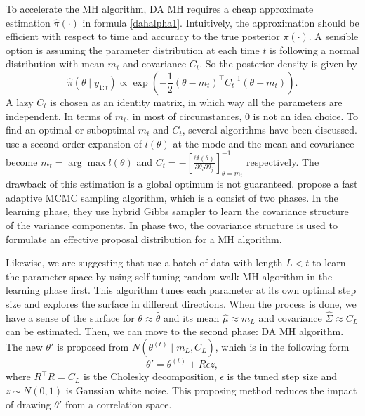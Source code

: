 To accelerate the MH algorithm, DA MH requires a cheap approximate estimation $\hat{\pi}(\cdot)$ in formula \eqref{dahalpha1}. Intuitively, the approximation should be efficient with respect to time and accuracy to the true posterior $\pi(\cdot)$. A sensible option is assuming the parameter distribution at each time $t$ is following a normal distribution with mean $m_t$ and covariance $C_t$. So the posterior density is given by 
\begin{equation}
\hat{\pi}(\theta\mid y_{1:t}) \propto \exp\left( -\frac{1}{2}(\theta-m_t)^\top C_t^{-1}(\theta-m_t)\right). 
\end{equation}
A lazy $C_t$ is chosen as an identity matrix, in which way all the parameters are independent. In terms of $m_t$, in most of circumstances, 0 is not an idea choice. To find an optimal or suboptimal $m_t$ and $C_t$, several algorithms have been discussed. \cite{stroud2018bayesian} use a second-order expansion of $l(\theta)$ at the mode and the mean and covariance become $m_t=\arg \max l(\theta)$ and $C_t = - \left[ \frac{\partial l(\theta)}{\partial \theta_i \partial \theta_j} \right]_{\theta=m_t}^{-1}$ respectively. The drawback of this estimation is a global optimum is not guaranteed. \cite{mathew2012bayesian} propose a fast adaptive MCMC sampling algorithm, which is a consist of two phases. In the learning phase, they use hybrid Gibbs sampler to learn the covariance structure of the variance components. In phase two, the covariance structure is used to formulate an effective proposal distribution for a MH algorithm. 


Likewise, we are suggesting that use a batch of data with length $L<t$ to learn the parameter space by using self-tuning random walk MH algorithm in the learning phase first. This algorithm tunes each parameter at its own optimal step size and explores the surface in different directions. When the process is done, we have a sense of the surface for $\theta\approx\hat{\theta}$ and its mean $\hat{\mu}\approx m_L$ and covariance $\hat{\Sigma}\approx C_L$ can be estimated. Then, we can move to the second phase: DA MH algorithm. The new $\theta'$ is proposed from  $N\left(\theta^{(t)}\mid m_L,C_L\right)$, which is in the following form 
\begin{equation}
\theta' = \theta^{(t)} + R\epsilon z,
\end{equation}
where $R^\top R = C_L$ is the Cholesky decomposition, $\epsilon$ is the tuned step size and $z\sim N(0,1)$ is Gaussian white noise. This proposing method reduces the impact of drawing $\theta'$ from a correlation space. 


